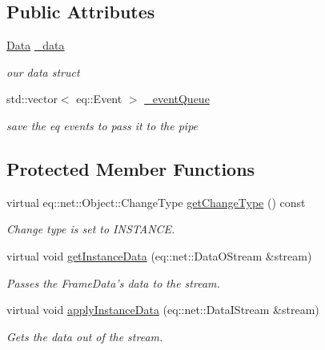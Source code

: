 \subsection*{Public Attributes}
\begin{CompactItemize}
\item 
\hypertarget{a00010_bb269cc113e09a51c17d8d7400c6f1bb}{
\hyperlink{a00008}{Data} \hyperlink{a00010_bb269cc113e09a51c17d8d7400c6f1bb}{\_\-data}}
\label{a00010_bb269cc113e09a51c17d8d7400c6f1bb}

\begin{CompactList}\small\item\em our data struct \item\end{CompactList}\item 
\hypertarget{a00010_11589a99465896a1c632509c463c1577}{
std::vector$<$ eq::Event $>$ \hyperlink{a00010_11589a99465896a1c632509c463c1577}{\_\-eventQueue}}
\label{a00010_11589a99465896a1c632509c463c1577}

\begin{CompactList}\small\item\em save the eq events to pass it to the pipe \item\end{CompactList}\end{CompactItemize}
\subsection*{Protected Member Functions}
\begin{CompactItemize}
\item 
virtual eq::net::Object::ChangeType \hyperlink{a00010_00b26118522849f58fcc66b140a1c005}{getChangeType} () const 
\begin{CompactList}\small\item\em Change type is set to INSTANCE. \item\end{CompactList}\item 
virtual void \hyperlink{a00010_67d459f6a98840d88b1a0955aa4f517e}{getInstanceData} (eq::net::DataOStream \&stream)
\begin{CompactList}\small\item\em Passes the FrameData's data to the stream. \item\end{CompactList}\item 
virtual void \hyperlink{a00010_2dc720c76b371a3bd5edba7020808542}{applyInstanceData} (eq::net::DataIStream \&stream)
\begin{CompactList}\small\item\em Gets the data out of the stream. \item\end{CompactList}\end{CompactItemize}


